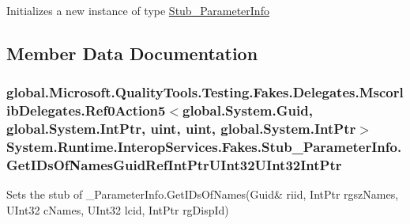 Initializes a new instance of type \hyperlink{class_system_1_1_runtime_1_1_interop_services_1_1_fakes_1_1_stub___parameter_info}{Stub\-\_\-\-Parameter\-Info}



\subsection{Member Data Documentation}
\hypertarget{class_system_1_1_runtime_1_1_interop_services_1_1_fakes_1_1_stub___parameter_info_a6796293bafe36d4618504d978fd44e55}{
\subsubsection[{Get\-I\-Ds\-Of\-Names\-Guid\-Ref\-Int\-Ptr\-U\-Int32\-U\-Int32\-Int\-Ptr}]{\setlength{\rightskip}{0pt plus 5cm}global.\-Microsoft.\-Quality\-Tools.\-Testing.\-Fakes.\-Delegates.\-Mscorlib\-Delegates.\-Ref0\-Action5$<$global.\-System.\-Guid, global.\-System.\-Int\-Ptr, uint, uint, global.\-System.\-Int\-Ptr$>$ System.\-Runtime.\-Interop\-Services.\-Fakes.\-Stub\-\_\-\-Parameter\-Info.\-Get\-I\-Ds\-Of\-Names\-Guid\-Ref\-Int\-Ptr\-U\-Int32\-U\-Int32\-Int\-Ptr}}\label{class_system_1_1_runtime_1_1_interop_services_1_1_fakes_1_1_stub___parameter_info_a6796293bafe36d4618504d978fd44e55}


Sets the stub of \-\_\-\-Parameter\-Info.\-Get\-I\-Ds\-Of\-Names(Guid\& riid, Int\-Ptr rgsz\-Names, U\-Int32 c\-Names, U\-Int32 lcid, Int\-Ptr rg\-Disp\-Id)

